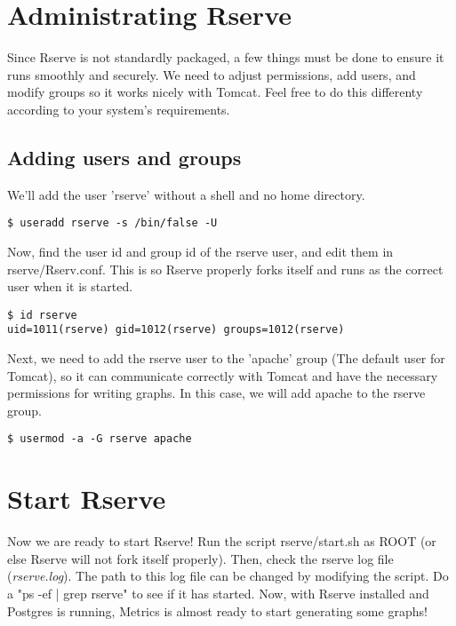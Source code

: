 \documentclass{article}
\begin{document}
\section{Administrating Rserve}
Since Rserve is not standardly packaged, a few things must be done to
ensure it runs smoothly and securely. We need to adjust permissions, add
users, and modify groups so it works nicely with Tomcat. Feel free to do
this differenty according to your system's requirements.

\subsection{Adding users and groups}
We'll add the user 'rserve' without a shell and no home directory.

\begin{verbatim}
$ useradd rserve -s /bin/false -U
\end{verbatim}

Now, find the user id and group id of the rserve user, and edit them in
rserve/Rserv.conf. This is so Rserve properly forks itself and runs as the
correct user when it is started.

\begin{verbatim}
$ id rserve
uid=1011(rserve) gid=1012(rserve) groups=1012(rserve)
\end{verbatim}

Next, we need to add the rserve user to the 'apache' group (The default
user for Tomcat), so it can communicate correctly with Tomcat and have the
necessary permissions for writing graphs. In this case, we will add apache
to the rserve group.

\begin{verbatim}
$ usermod -a -G rserve apache
\end{verbatim}

\section{Start Rserve}
Now we are ready to start Rserve! Run the script rserve/start.sh as ROOT
(or else Rserve will not fork itself properly). Then, check the rserve log
file (\emph{rserve.log}). The path to this log file can be changed by
modifying the script. Do a "ps -ef | grep rserve" to see if it has started.
Now, with Rserve installed and Postgres is running, Metrics is almost ready
to start generating some graphs!
\end{document}
